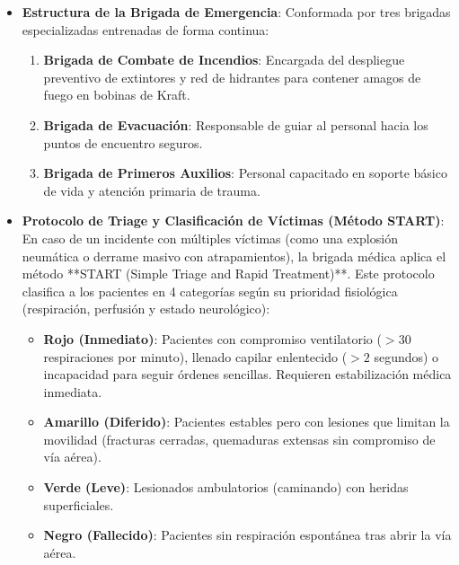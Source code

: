 \documentclass[11pt, letterpaper]{article}
\begin{document}
\begin{itemize}
    \item \textbf{Estructura de la Brigada de Emergencia}: Conformada por tres brigadas especializadas entrenadas de forma continua:
    \begin{enumerate}
        \item \textbf{Brigada de Combate de Incendios}: Encargada del despliegue preventivo de extintores y red de hidrantes para contener amagos de fuego en bobinas de Kraft.
        \item \textbf{Brigada de Evacuación}: Responsable de guiar al personal hacia los puntos de encuentro seguros.
        \item \textbf{Brigada de Primeros Auxilios}: Personal capacitado en soporte básico de vida y atención primaria de trauma.
    \end{enumerate}

    \item \textbf{Protocolo de Triage y Clasificación de Víctimas (Método START)}:
    En caso de un incidente con múltiples víctimas (como una explosión neumática o derrame masivo con atrapamientos), la brigada médica aplica el método **START (Simple Triage and Rapid Treatment)**. Este protocolo clasifica a los pacientes en 4 categorías según su prioridad fisiológica (respiración, perfusión y estado neurológico):
    \begin{itemize}
        \item \textbf{Rojo (Inmediato)}: Pacientes con compromiso ventilatorio ($>30$ respiraciones por minuto), llenado capilar enlentecido ($>2$ segundos) o incapacidad para seguir órdenes sencillas. Requieren estabilización médica inmediata.
        \item \textbf{Amarillo (Diferido)}: Pacientes estables pero con lesiones que limitan la movilidad (fracturas cerradas, quemaduras extensas sin compromiso de vía aérea).
        \item \textbf{Verde (Leve)}: Lesionados ambulatorios (caminando) con heridas superficiales.
        \item \textbf{Negro (Fallecido)}: Pacientes sin respiración espontánea tras abrir la vía aérea.
    \end{itemize}


\end{itemize}
\end{document}
